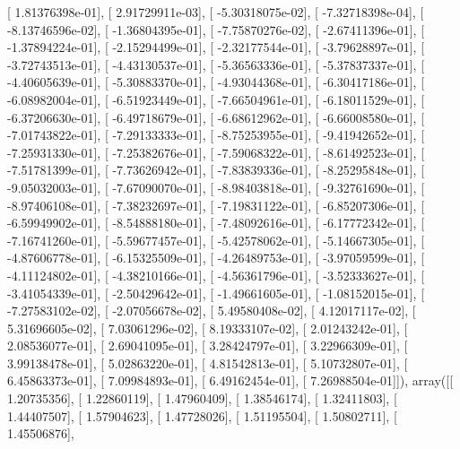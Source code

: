 \documentclass{article}
\begin{document}
       [  1.81376398e-01],
       [  2.91729911e-03],
       [ -5.30318075e-02],
       [ -7.32718398e-04],
       [ -8.13746596e-02],
       [ -1.36804395e-01],
       [ -7.75870276e-02],
       [ -2.67411396e-01],
       [ -1.37894224e-01],
       [ -2.15294499e-01],
       [ -2.32177544e-01],
       [ -3.79628897e-01],
       [ -3.72743513e-01],
       [ -4.43130537e-01],
       [ -5.36563336e-01],
       [ -5.37837337e-01],
       [ -4.40605639e-01],
       [ -5.30883370e-01],
       [ -4.93044368e-01],
       [ -6.30417186e-01],
       [ -6.08982004e-01],
       [ -6.51923449e-01],
       [ -7.66504961e-01],
       [ -6.18011529e-01],
       [ -6.37206630e-01],
       [ -6.49718679e-01],
       [ -6.68612962e-01],
       [ -6.66008580e-01],
       [ -7.01743822e-01],
       [ -7.29133333e-01],
       [ -8.75253955e-01],
       [ -9.41942652e-01],
       [ -7.25931330e-01],
       [ -7.25382676e-01],
       [ -7.59068322e-01],
       [ -8.61492523e-01],
       [ -7.51781399e-01],
       [ -7.73626942e-01],
       [ -7.83839336e-01],
       [ -8.25295848e-01],
       [ -9.05032003e-01],
       [ -7.67090070e-01],
       [ -8.98403818e-01],
       [ -9.32761690e-01],
       [ -8.97406108e-01],
       [ -7.38232697e-01],
       [ -7.19831122e-01],
       [ -6.85207306e-01],
       [ -6.59949902e-01],
       [ -8.54888180e-01],
       [ -7.48092616e-01],
       [ -6.17772342e-01],
       [ -7.16741260e-01],
       [ -5.59677457e-01],
       [ -5.42578062e-01],
       [ -5.14667305e-01],
       [ -4.87606778e-01],
       [ -6.15325509e-01],
       [ -4.26489753e-01],
       [ -3.97059599e-01],
       [ -4.11124802e-01],
       [ -4.38210166e-01],
       [ -4.56361796e-01],
       [ -3.52333627e-01],
       [ -3.41054339e-01],
       [ -2.50429642e-01],
       [ -1.49661605e-01],
       [ -1.08152015e-01],
       [ -7.27583102e-02],
       [ -2.07056678e-02],
       [  5.49580408e-02],
       [  4.12017117e-02],
       [  5.31696605e-02],
       [  7.03061296e-02],
       [  8.19333107e-02],
       [  2.01243242e-01],
       [  2.08536077e-01],
       [  2.69041095e-01],
       [  3.28424797e-01],
       [  3.22966309e-01],
       [  3.99138478e-01],
       [  5.02863220e-01],
       [  4.81542813e-01],
       [  5.10732807e-01],
       [  6.45863373e-01],
       [  7.09984893e-01],
       [  6.49162454e-01],
       [  7.26988504e-01]]), array([[ 1.20735356],
       [ 1.22860119],
       [ 1.47960409],
       [ 1.38546174],
       [ 1.32411803],
       [ 1.44407507],
       [ 1.57904623],
       [ 1.47728026],
       [ 1.51195504],
       [ 1.50802711],
       [ 1.45506876],
\end{document}
